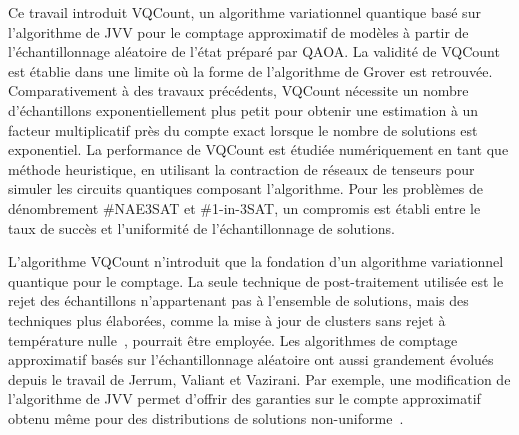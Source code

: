 \Conclusion %


Ce travail introduit VQCount, un algorithme variationnel quantique basé sur l'algorithme de JVV pour le comptage approximatif de modèles à partir de l'échantillonnage aléatoire de l'état préparé par QAOA. La validité de VQCount est établie dans une limite où la forme de l'algorithme de Grover est retrouvée. Comparativement à des travaux précédents, VQCount nécessite un nombre d'échantillons exponentiellement plus petit pour obtenir une estimation à un facteur multiplicatif près du compte exact lorsque le nombre de solutions est exponentiel. La performance de VQCount est étudiée numériquement en tant que méthode heuristique, en utilisant la contraction de réseaux de tenseurs pour simuler les circuits quantiques composant l'algorithme. Pour les problèmes de dénombrement \#NAE3SAT et \#1-in-3SAT, un compromis est établi entre le taux de succès et l'uniformité de l'échantillonnage de solutions. 


L'algorithme VQCount n'introduit que la fondation d'un algorithme variationnel quantique pour le comptage. La seule technique de post-traitement utilisée est le rejet des échantillons n'appartenant pas à l'ensemble de solutions, mais des techniques plus élaborées, comme la mise à jour de clusters sans rejet à température nulle~\cite{ochoaFeedingMultitudePolynomialtime2019}, pourrait être employée. Les algorithmes de comptage approximatif basés sur l'échantillonnage aléatoire ont aussi grandement évolués depuis le travail de Jerrum, Valiant et Vazirani. Par exemple, une modification de l'algorithme de JVV permet d'offrir des garanties sur le compte approximatif obtenu même pour des distributions de solutions non-uniforme~\cite{gomesSamplingModelCounting2007}.


